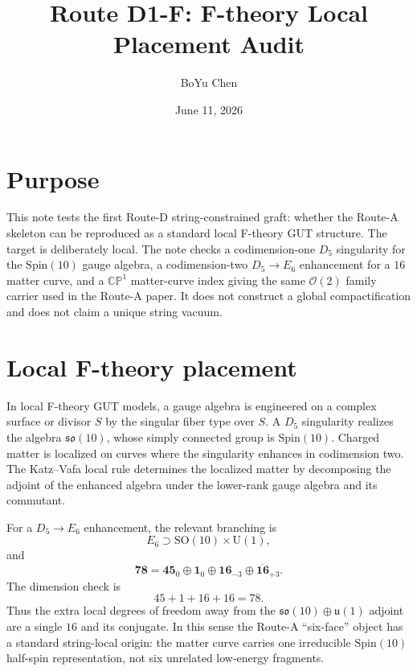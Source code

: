 \documentclass[11pt]{article}
\title{Route D1-F: F-theory Local Placement Audit}
\author{BoYu Chen}
\date{June 11, 2026}
\newcommand{\Spin}{\mathrm{Spin}}
\newcommand{\SO}{\mathrm{SO}}
\newcommand{\U}{\mathrm{U}}
\newcommand{\CP}{\mathbb{CP}}
\newcommand{\cO}{\mathcal{O}}
\begin{document}
\maketitle

\section*{Purpose}

This note tests the first Route-D string-constrained graft: whether the
Route-A skeleton can be reproduced as a standard local F-theory GUT structure.
The target is deliberately local.  The note checks a codimension-one
\(D_5\) singularity for the \(\Spin(10)\) gauge algebra, a codimension-two
\(D_5\to E_6\) enhancement for a \(16\) matter curve, and a
\(\CP^1\) matter-curve index giving the same \(\cO(2)\) family carrier used in
the Route-A paper.  It does not construct a global compactification and does
not claim a unique string vacuum.

\section{Local F-theory placement}

In local F-theory GUT models, a gauge algebra is engineered on a complex
surface or divisor \(S\) by the singular fiber type over \(S\).  A \(D_5\)
singularity realizes the algebra \(\mathfrak{so}(10)\), whose simply connected
group is \(\Spin(10)\).  Charged matter is localized on curves where the
singularity enhances in codimension two.  The Katz--Vafa local rule determines
the localized matter by decomposing the adjoint of the enhanced algebra under
the lower-rank gauge algebra and its commutant.

For a \(D_5\to E_6\) enhancement, the relevant branching is
\begin{equation}
  E_6 \supset \SO(10)\times \U(1),
\end{equation}
and
\begin{equation}
  \mathbf{78}
  =
  \mathbf{45}_0
  \oplus
  \mathbf{1}_0
  \oplus
  \mathbf{16}_{-3}
  \oplus
  \overline{\mathbf{16}}_{+3}.
  \label{eq:e6-so10-branch}
\end{equation}
The dimension check is
\begin{equation}
  45+1+16+16=78.
\end{equation}
Thus the extra local degrees of freedom away from the
\(\mathfrak{so}(10)\oplus\mathfrak u(1)\) adjoint are a single \(16\) and its
conjugate.  In this sense the Route-A ``six-face'' object has a standard
string-local origin: the matter curve carries one irreducible \(\Spin(10)\)
half-spin representation, not six unrelated low-energy fragments.
\end{document}
